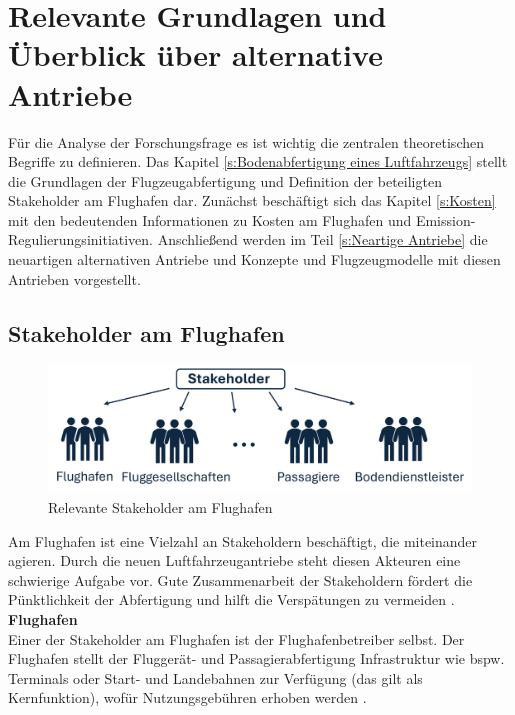 \chapter{Relevante Grundlagen und Überblick über alternative Antriebe}
\label{ch:Relevante Grundlagen und Überblick über alternative Antriebe}
Für die Analyse der Forschungsfrage es ist wichtig die zentralen theoretischen Begriffe zu definieren. 
Das Kapitel \ref{s:Bodenabfertigung eines Luftfahrzeugs} stellt die Grundlagen der Flugzeugabfertigung und Definition
der beteiligten Stakeholder am Flughafen dar. Zunächst beschäftigt sich das Kapitel \ref{s:Kosten}
mit den bedeutenden Informationen zu Kosten am Flughafen und Emission-Regulierungsinitiativen. 
Anschließend werden im Teil \ref{s:Neartige Antriebe}
die neuartigen alternativen Antriebe und Konzepte und Flugzeugmodelle mit diesen Antrieben vorgestellt.

\section{Stakeholder am Flughafen}
\label{s:Stakeholder am Flughafen}
%
\begin{figure}[h]
	\centering
	\includegraphics[width=0.8\linewidth]{Bilder/Stakeholder.png}
	\caption[Relevante Stakeholder am Flughafen]{Relevante Stakeholder am Flughafen}
	\label{stakeholder}
\end{figure}

Am Flughafen ist eine Vielzahl an Stakeholdern beschäftigt, die miteinander agieren. Durch die neuen Luftfahrzeugantriebe 
steht diesen Akteuren eine schwierige Aufgabe vor. Gute Zusammenarbeit der Stakeholdern fördert 
die Pünktlichkeit der Abfertigung und hilft die Verspätungen zu vermeiden \cite{schmidt2016challenges}.\\

\textbf{Flughafen} \\
Einer der Stakeholder am Flughafen ist der Flughafenbetreiber selbst. 
Der Flughafen stellt der Fluggerät- und Passagierabfertigung Infrastruktur wie bspw. Terminals oder Start- und Landebahnen zur Verfügung (das gilt als Kernfunktion), 
wofür Nutzungsgebühren erhoben werden \cite{conrady2019luftverkehr}. %

